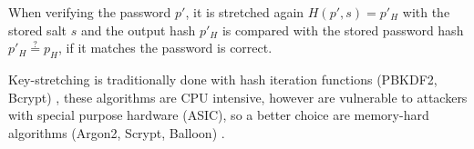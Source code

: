 When verifying the password $p'$, it is stretched again $H(p', s) = p{'}_H$ with the stored salt $s$ and the output hash $p{'}_H$ is compared with the stored password hash $p{'}_H \stackrel{?}{=} p_H$, if it matches the password is correct.

Key-stretching \cite{blocki2018economics} is traditionally done with hash iteration functions (PBKDF2, Bcrypt) \cite{kaliski2000pkcs, provos1999bcrypt}, these algorithms are CPU intensive, however are vulnerable to attackers with special purpose hardware (ASIC), so a better choice are memory-hard algorithms (Argon2, Scrypt, Balloon) \cite{biryukov2016argon2, percival2016scrypt, boneh2016balloon}.\\
%
%

